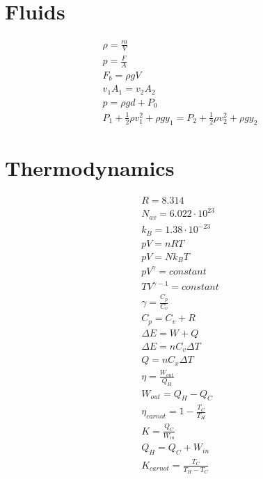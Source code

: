 \documentclass[12pt, letterpaper]{article}
\begin{document}
\section*{Fluids}
\begin{align}
  \rho = \frac{m}{V} \\
  p = \frac{F}{A} \\
  F_b = \rho g V \\
  v_1A_1 = v_2A_2 \\
  p = \rho gd + P_0 \\
  P_1 + \frac{1}{2}\rho v_1^2 + \rho g y_1 = P_2 + \frac{1}{2}\rho v_2^2 + \rho g y_2
\end{align}

\section*{Thermodynamics}
\begin{align}
  R = 8.314 \\
  N_{av} = 6.022 \cdot 10^{23} \\
  k_B = 1.38 \cdot 10^{-23} \\
  pV = nRT \\
  pV = Nk_BT \\
  pV^\gamma = constant \\
  TV^{\gamma - 1} = constant \\
  \gamma = \frac{C_p}{C_v} \\
  C_p = C_v + R \\
  \Delta E = W + Q \\
  \Delta E = nC_v\Delta T \\
  Q = nC_x\Delta T \\
  \eta = \frac{W_{out}}{Q_H} \\
  W_{out} = Q_H - Q_C \\
  \eta_{carnot} = 1 - \frac{T_C}{T_H} \\
  K = \frac{Q_C}{W_{in}} \\
  Q_H = Q_C + W_{in} \\
  K_{carnot} = \frac{T_C}{T_H - T_C}
\end{align}
\end{document}
